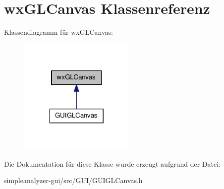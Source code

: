 \hypertarget{classwxGLCanvas}{\section{wx\-G\-L\-Canvas Klassenreferenz}
\label{classwxGLCanvas}
}


Klassendiagramm für wx\-G\-L\-Canvas\-:
\nopagebreak
\begin{figure}[H]
\begin{center}
\leavevmode
\includegraphics[width=160pt]{classwxGLCanvas__inherit__graph}
\end{center}
\end{figure}


Die Dokumentation für diese Klasse wurde erzeugt aufgrund der Datei\-:\begin{DoxyCompactItemize}
\item 
simpleanalyzer-\/gui/src/\-G\-U\-I/G\-U\-I\-G\-L\-Canvas.\-h\end{DoxyCompactItemize}
